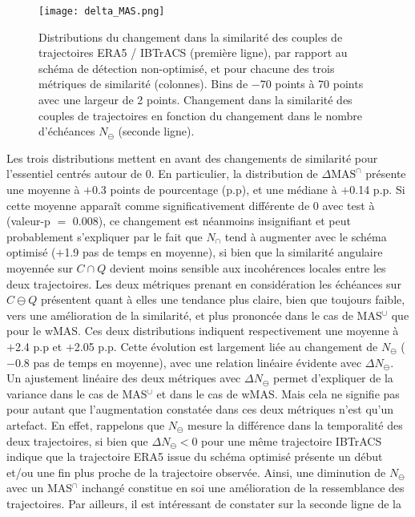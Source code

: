 \documentclass[../main.tex]{subfiles}
\begin{document}
\begin{figure}[tb]
    \centering
    \texttt{[image: delta\_MAS.png]}
    \caption{Distributions du changement dans la similarité des couples de trajectoires ERA5 / IBTrACS (première ligne), par rapport au schéma de détection
    non-optimisé, et pour chacune des trois métriques de similarité (colonnes). Bins de \num{-70} points à \num{70} points avec une largeur de \num{2}
    points. Changement dans la similarité des couples de trajectoires en fonction du changement dans le nombre d'échéances $N_\ominus$ (seconde ligne).}
    \label{fig:delta_MAS}
\end{figure}

Les trois distributions mettent en avant des changements de similarité pour l'essentiel centrés autour de \num{0}. En particulier, la distribution de $\Delta
\text{MAS}^\cap$ présente une moyenne à $+$\num{0.3} points de pourcentage (p.p), et une médiane à $+$\num{0.14} p.p. Si cette moyenne apparaît comme
significativement différente de \num{0} avec test à  (valeur-p $=$ \num{0.008}), ce changement est néanmoins insignifiant et peut probablement
s'expliquer par le fait que $N_\cap$ tend à augmenter avec le schéma optimisé ($+$\num{1.9} pas de temps en moyenne), si bien que la similarité angulaire
moyennée sur $C \cap Q$ devient moins sensible aux incohérences locales entre les deux trajectoires. Les deux métriques prenant en considération les échéances
sur $C \ominus Q$ présentent quant à elles une tendance plus claire, bien que toujours faible, vers une amélioration de la similarité, et plus prononcée dans le
cas de MAS$^\cup$ que pour le wMAS. Ces deux distributions indiquent respectivement une moyenne à $+$\num{2.4} p.p et $+$\num{2.05} p.p. Cette évolution est
largement liée au changement de $N_\ominus$ ($-$\num{0.8} pas de temps en moyenne), avec une relation linéaire évidente avec $\Delta N_\ominus$. Un ajustement
linéaire des deux métriques avec $\Delta N_\ominus$ permet d'expliquer  de la variance dans le cas de MAS$^\cup$ et  dans le cas de wMAS. Mais
cela ne signifie pas pour autant que l'augmentation constatée dans ces deux métriques n'est qu'un artefact. En effet, rappelons que $N_\ominus$ mesure la
différence dans la temporalité des deux trajectoires, si bien que $\Delta N_\ominus < 0$ pour une même trajectoire IBTrACS indique que la trajectoire ERA5 issue
du schéma optimisé présente un début et/ou une fin plus proche de la trajectoire observée. Ainsi, une diminution de $N_\ominus$ avec un MAS$^\cap$ inchangé
constitue en soi une amélioration de la ressemblance des trajectoires. Par ailleurs, il est intéressant de constater sur la seconde ligne de la
\end{document}
